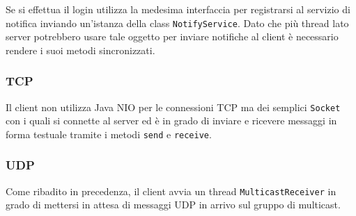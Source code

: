 Se si effettua il login utilizza la medesima interfaccia per registrarsi al servizio di notifica
inviando un'istanza della class \verb|NotifyService|. Dato che più thread lato server potrebbero
usare tale oggetto per inviare notifiche al client è necessario rendere i suoi metodi
sincronizzati.

\subsubsection{TCP}
Il client non utilizza Java NIO per le connessioni TCP ma dei semplici \verb|Socket| con i quali
si connette al server ed è in grado di inviare e ricevere messaggi in forma testuale tramite i
metodi \verb|send| e \verb|receive|.

\subsubsection{UDP}
Come ribadito in precedenza, il client avvia un thread \verb|MulticastReceiver| in grado di
mettersi in attesa di messaggi UDP in arrivo sul gruppo di multicast.
